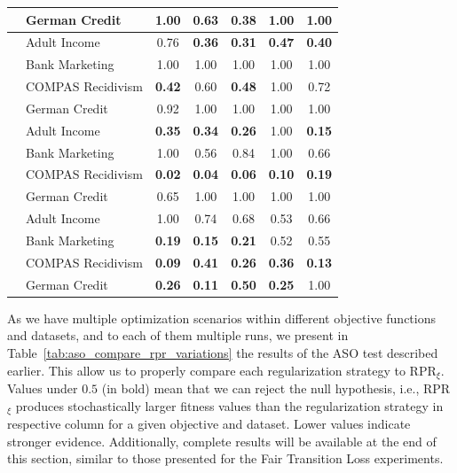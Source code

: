 \begin{table}[ht]
{\begin{tabular}{llccccc}
 & German Credit & 1.00 & 0.63 & \textbf{0.38} & 1.00 & 1.00 \\
\midrule
{} 
 & Adult Income & 0.76 & \textbf{0.36} & \textbf{0.31} & \textbf{0.47} & \textbf{0.40} \\
 & Bank Marketing & 1.00 & 1.00 & 1.00 & 1.00 & 1.00 \\
 & COMPAS Recidivism & \textbf{0.42} & 0.60 & \textbf{0.48} & 1.00 & 0.72 \\
 & German Credit & 0.92 & 1.00 & 1.00 & 1.00 & 1.00 \\
\midrule
{} 
 & Adult Income & \textbf{0.35} & \textbf{0.34} & \textbf{0.26} & 1.00 & \textbf{0.15} \\
 & Bank Marketing & 1.00 & 0.56 & 0.84 & 1.00 & 0.66 \\
 & COMPAS Recidivism & \textbf{0.02} & \textbf{0.04} & \textbf{0.06} & \textbf{0.10} & \textbf{0.19} \\
 & German Credit & 0.65 & 1.00 & 1.00 & 1.00 & 1.00 \\
\midrule
{} 
 & Adult Income & 1.00 & 0.74 & 0.68 & 0.53 & 0.66 \\
 & Bank Marketing & \textbf{0.19} & \textbf{0.15} & \textbf{0.21} & 0.52 & 0.55 \\
 & COMPAS Recidivism & \textbf{0.09} & \textbf{0.41} & \textbf{0.26} & \textbf{0.36} & \textbf{0.13} \\
 & German Credit & \textbf{0.26} & \textbf{0.11} & \textbf{0.50} & \textbf{0.25} & 1.00 \\
\bottomrule
\end{tabular}
    }
\end{table}

As we have multiple optimization scenarios within different objective functions and datasets, and to each of them multiple runs, we present in Table~\ref{tab:aso_compare_rpr_variations} the results of the ASO test described earlier. This allow us to properly compare each regularization strategy to RPR$_{\xi}$. Values under $0.5$ (in bold) mean that we can reject the null hypothesis, i.e., RPR$_{\xi}$ produces stochastically larger fitness values than the regularization strategy in respective column for a given objective and dataset. Lower values indicate stronger evidence. Additionally, complete results will be available at the end of this section, similar to those presented for the Fair Transition Loss experiments.

